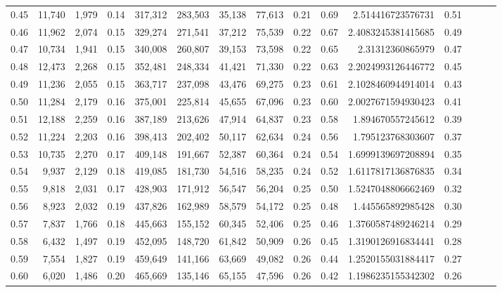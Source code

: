 \begin{tabular}{rrrrrrrrrrrrrrr}
0.45 &  11,740 &  1,979 &  0.14 &  317,312 &  283,503 &   35,138 &   77,613 &  0.21 &  0.69 &       2.514416723576731 &      0.51 \\
0.46 &  11,962 &  2,074 &  0.15 &  329,274 &  271,541 &   37,212 &   75,539 &  0.22 &  0.67 &      2.4083245381415685 &      0.49 \\
0.47 &  10,734 &  1,941 &  0.15 &  340,008 &  260,807 &   39,153 &   73,598 &  0.22 &  0.65 &        2.31312360865979 &      0.47 \\
0.48 &  12,473 &  2,268 &  0.15 &  352,481 &  248,334 &   41,421 &   71,330 &  0.22 &  0.63 &      2.2024993126446772 &      0.45 \\
0.49 &  11,236 &  2,055 &  0.15 &  363,717 &  237,098 &   43,476 &   69,275 &  0.23 &  0.61 &      2.1028460944914014 &      0.43 \\
0.50 &  11,284 &  2,179 &  0.16 &  375,001 &  225,814 &   45,655 &   67,096 &  0.23 &  0.60 &      2.0027671594930423 &      0.41 \\
0.51 &  12,188 &  2,259 &  0.16 &  387,189 &  213,626 &   47,914 &   64,837 &  0.23 &  0.58 &       1.894670557245612 &      0.39 \\
0.52 &  11,224 &  2,203 &  0.16 &  398,413 &  202,402 &   50,117 &   62,634 &  0.24 &  0.56 &       1.795123768303607 &      0.37 \\
0.53 &  10,735 &  2,270 &  0.17 &  409,148 &  191,667 &   52,387 &   60,364 &  0.24 &  0.54 &      1.6999139697208894 &      0.35 \\
0.54 &   9,937 &  2,129 &  0.18 &  419,085 &  181,730 &   54,516 &   58,235 &  0.24 &  0.52 &      1.6117817136876835 &      0.34 \\
0.55 &   9,818 &  2,031 &  0.17 &  428,903 &  171,912 &   56,547 &   56,204 &  0.25 &  0.50 &      1.5247048806662469 &      0.32 \\
0.56 &   8,923 &  2,032 &  0.19 &  437,826 &  162,989 &   58,579 &   54,172 &  0.25 &  0.48 &       1.445565892985428 &      0.30 \\
0.57 &   7,837 &  1,766 &  0.18 &  445,663 &  155,152 &   60,345 &   52,406 &  0.25 &  0.46 &      1.3760587489246214 &      0.29 \\
0.58 &   6,432 &  1,497 &  0.19 &  452,095 &  148,720 &   61,842 &   50,909 &  0.26 &  0.45 &      1.3190126916834441 &      0.28 \\
0.59 &   7,554 &  1,827 &  0.19 &  459,649 &  141,166 &   63,669 &   49,082 &  0.26 &  0.44 &      1.2520155031884417 &      0.27 \\
0.60 &   6,020 &  1,486 &  0.20 &  465,669 &  135,146 &   65,155 &   47,596 &  0.26 &  0.42 &      1.1986235155342302 &      0.26 \\

\end{tabular}
